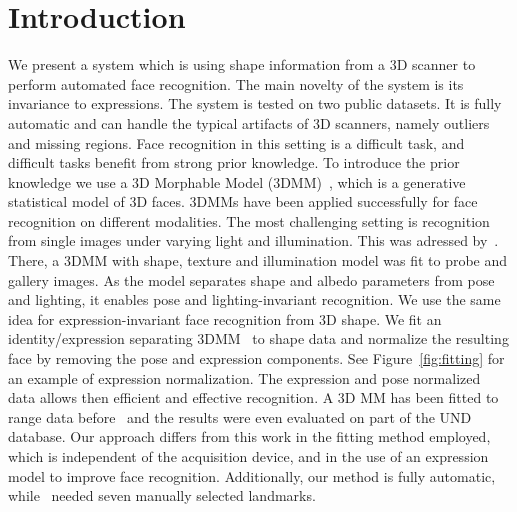 \documentclass[10pt,twocolumn,letterpaper]{article}
\begin{document}
\section{Introduction}
We present a system which is using shape information from a 3D scanner to
perform automated face recognition. The main novelty of the system is its
invariance to expressions. The system is tested on two
public datasets. It is fully automatic and can handle the typical artifacts of
3D scanners, namely outliers and missing regions. Face recognition in this
setting is a difficult task, and difficult tasks benefit from strong prior knowledge.
To introduce the prior knowledge we use a 3D Morphable Model
(3DMM)~\cite{blanz:model}, which is a generative statistical model of 3D faces.
3DMMs have been applied successfully for face recognition on different
modalities. The most challenging setting is recognition from single images
under varying light and illumination.  This was adressed
by~\cite{blanz03:face_rec,romdhani:recognition}. There, a 3DMM with shape,
texture and illumination model was fit to probe and gallery images.  As the
model separates shape and albedo parameters from pose and lighting, it enables
pose and lighting-invariant recognition. We use the same idea for
expression-invariant face recognition from 3D shape. We fit an identity/expression
separating
3DMM~\cite{blanz03:expression} to shape data and normalize the
resulting face by removing the pose and expression components. See
Figure~\ref{fig:fitting} for an example of expression normalization. The
expression and pose normalized data allows then efficient and effective
recognition. A 3D MM has been fitted to range data before~\cite{blanz07:range}
and the results were even evaluated on part of the UND database. Our approach
differs from this work in the fitting method employed, which is independent of
the acquisition device, and in the use of an expression model to improve face
recognition. Additionally, our method is fully automatic,
while~\cite{blanz07:range} needed seven manually selected landmarks.
\end{document}
